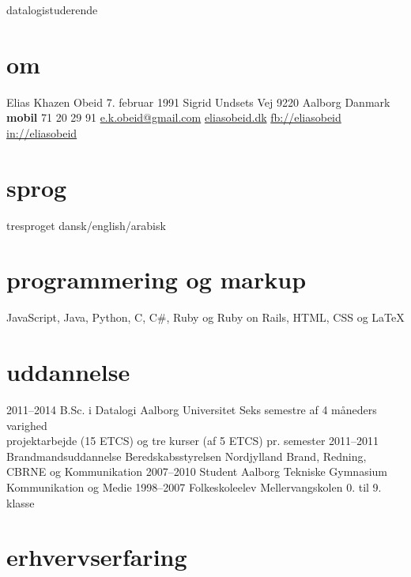 \documentclass[]{friggeri-cv}
\begin{document}
       {datalogistuderende}


\begin{aside}
  \section{om}
    Elias Khazen Obeid
    7. februar 1991
    Sigrid Undsets Vej 
    9220 Aalborg
    Danmark
    ~
    \textbf{mobil} 71 20 29 91
    \href{mailto:e.k.obeid@gmail.com}{e.k.obeid@gmail.com}
    \href{http://eliasobeid.dk}{eliasobeid.dk}
    \href{http://facebook.com/eliaskhazenobeid}{fb://eliasobeid}
    \href{http://www.linkedin.com/in/eliasobeid}{in://eliasobeid}
  \section{sprog}
    tresproget dansk/english/arabisk
  \section{programmering og markup}
    JavaScript, Java,
    Python, C, C\#,
    Ruby og Ruby on Rails,
    HTML, CSS og \LaTeX{}
\end{aside}


\section{uddannelse}

\begin{entrylist}
  \entry
    {2011–2014}
    {B.Sc. {\normalfont i Datalogi}}
    {Aalborg Universitet}
    {Seks semestre af 4 måneders varighed \\
     projektarbejde (15 ETCS) og tre kurser (af 5 ETCS) pr. semester}
  \entry
    {2011–2011}
    {Brandmandsuddannelse}
    {Beredskabsstyrelsen Nordjylland}
    {Brand, Redning, CBRNE og Kommunikation}
  \entry
    {2007–2010}
    {Student}
    {Aalborg Tekniske Gymnasium}
    {Kommunikation og Medie}
  \entry
    {1998–2007}
    {Folkeskoleelev}
    {Mellervangskolen}
    {0. til 9. klasse}
\end{entrylist}

\section{erhvervserfaring}
\end{document}
